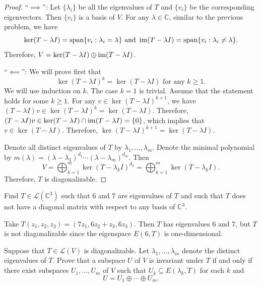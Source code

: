 \documentclass{article}
\begin{document}
\begin{proof}
  ``\( \implies \)'': Let \( \{\lambda_i\} \) be all the eigenvalues of \( T \) and \( \{v_i\} \) be the corresponding eigenvectors. Then \( \{v_i\} \) is a basis of \( V \). For any \( \lambda \in \mathbb{C} \), similar to the previous problem, we have
  \[ \ker (T-\lambda I) = \operatorname{span}\{v_i: \lambda_i = \lambda\}\text{ and }\operatorname{im} (T-\lambda I) = \operatorname{span}\{v_i: \lambda_i \neq \lambda\}. \]
  Therefore, \( V=\ker (T-\lambda I)\oplus \operatorname{im} (T-\lambda I) \).\par
  ``\( \impliedby \)'': We will prove first that
  \[ \ker(T-\lambda I)^k=\ker(T-\lambda I) \text{ for any } k\geq 1. \]
  We will use induction on \( k \). The case \( k=1 \) is trivial. Assume that the statement holds for some \( k\geq 1 \). For any \( v\in \ker(T-\lambda I)^{k+1} \), we have \( (T-\lambda I)v\in \ker(T-\lambda I)^k=\ker(T-\lambda I) \). Therefore, \( (T-\lambda I)v\in \ker(T-\lambda I)\cap\operatorname{im} (T-\lambda I)=\{0\} \), which implies that \( v\in \ker(T-\lambda I) \). Therefore, \( \ker(T-\lambda I)^{k+1}=\ker(T-\lambda I) \).\par
  Denote all distinct eigenvalues of \( T \) by \( \lambda_1,\dots,\lambda_m \). Denote the  minimal polynomial by \( m(\lambda)=(\lambda-\lambda_1)^{d_1}\cdots(\lambda-\lambda_m)^{d_m} \). Then
  \[ V=\bigoplus_{k=1}^{m}\ker(T-\lambda_k I)^{d_k}=\bigoplus_{k=1}^{m}\ker(T-\lambda_k I). \]
  Therefore, \( T \) is diagonalizable.
\end{proof}



\begin{problem}[5D-11]
Find $T \in \mathcal{L}(\mathbb{C}^3)$ such that $6$ and $7$ are eigenvalues of $T$ and such that $T$ does not have a diagonal matrix with respect to any basis of $\mathbb{C}^3$.
\end{problem}

\begin{solution}
  Take \( T(z_1,z_2,z_3)=(7z_1, 6z_2+z_3, 6z_3) \). Then \( T \) has eigenvalues \( 6 \) and \( 7 \), but \( T \) is not diagonalizable since the eigenspace \( E(6,T) \) is one-dimensional.
\end{solution}



\begin{problem}[5D-16]
Suppose that $T \in \mathcal{L}(V)$ is diagonalizable. Let $\lambda_1, \ldots, \lambda_m$ denote the distinct eigenvalues of $T$. Prove that a subspace $U$ of $V$ is invariant under $T$ if and only if there exist subspaces $U_1, \ldots, U_m$ of $V$ such that $U_k \subseteq E(\lambda_k, T)$ for each $k$ and
\[
U = U_1 \oplus \cdots \oplus U_m.
\]
\end{problem}
\end{document}
